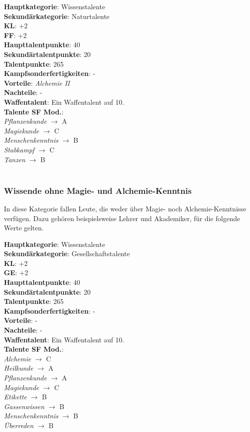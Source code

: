 \textbf{Hauptkategorie}: Wissenstalente \\
\textbf{Sekundärkategorie}: Naturtalente \\
\textbf{KL}: +2 \\
\textbf{FF}: +2 \\
\textbf{Haupttalentpunkte}: 40 \\
\textbf{Sekundärtalentpunkte}: 20 \\
\textbf{Talentpunkte}: 265 \\
\textbf{Kampfsonderfertigkeiten}: - \\
\textbf{Vorteile}: \textit{Alchemie II} \\
\textbf{Nachteile}: - \\
\textbf{Waffentalent}: Ein Waffentalent auf 10.\\
\textbf{Talente SF Mod.}: \\
\textit{Pflanzenkunde} $\rightarrow$ A \\
\textit{Magiekunde} $\rightarrow$ C \\ 
\textit{Menschenkenntnis} $\rightarrow$ B \\
\textit{Stabkampf} $\rightarrow$ C \\
\textit{Tanzen} $\rightarrow$ B \\
~\\

\subsubsection{Wissende ohne Magie- und Alchemie-Kenntnis}
In diese Kategorie fallen Leute, die weder über Magie- noch Alchemie-Kenntnisse verfügen. Dazu gehören beispielsweise Lehrer und Akademiker, für die folgende Werte gelten.

\textbf{Hauptkategorie}: Wissenstalente \\
\textbf{Sekundärkategorie}: Gesellschaftstalente \\
\textbf{KL}: +2 \\
\textbf{GE}: +2 \\
\textbf{Haupttalentpunkte}: 40 \\
\textbf{Sekundärtalentpunkte}: 20 \\
\textbf{Talentpunkte}: 265 \\
\textbf{Kampfsonderfertigkeiten}: - \\
\textbf{Vorteile}: - \\
\textbf{Nachteile}: - \\
\textbf{Waffentalent}: Ein Waffentalent auf 10.\\
\textbf{Talente SF Mod.}: \\
\textit{Alchemie} $\rightarrow$ C \\
\textit{Heilkunde} $\rightarrow$ A \\
\textit{Pflanzenkunde} $\rightarrow$ A \\
\textit{Magiekunde} $\rightarrow$ C \\
\textit{Etikette} $\rightarrow$ B \\
\textit{Gassenwissen} $\rightarrow$ B \\
\textit{Menschenkenntnis} $\rightarrow$ B \\
\textit{Überreden} $\rightarrow$ B \\


